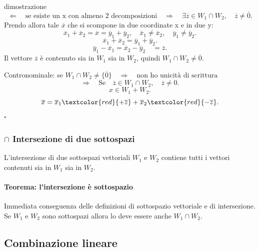 \documentclass[x11names]{article}
\newcommand*{\QEDB}{\null\nobreak\hfill\ensuremath{\square}}%
\begin{document}
\begin{es}{dimostrazione}
\[
\Leftarrow \quad \text{se esiste un x con almeno 2 decomposizioni} \quad \Rightarrow \quad \exists \overline{z} \in W_1 \cap W_2,\quad \overline{z} \neq \overline{0}
.\] 
Prendo allora tale $\overline{x}$ che si scompone in due coordinate x e in due y:
\[
\overline{x}_{1} + \overline{x}_{2} = \overline{x} = \overline{y}_{1} + \overline{y}_{2}, \quad \overline{x}_{1} \neq \overline{x}_{2}, \quad \overline{y}_{1} \neq \overline{y}_{2}
.\] 
\[
\overline{x}_{1} + \overline{x}_{2} = \overline{y}_{1} + \overline{y}_{2}
.\] 
\[
\overline{y}_{1} - \overline{x}_{1} = \overline{x}_{2} - \overline{y}_{2} \quad = \overline{z}
.\] 
Il vettore $\overline{z}$ è contenuto sia in $W_1$ sia in $W_2$, quindi $W_1 \cap W_2 \neq \overline{0}$.

Contronominale: se $W_1 \cap W_2 \neq \{\overline{0}\} \quad \Rightarrow \quad \text{non ho unicità di scrittura}$
\[
\Rightarrow \quad \text{Se} \quad \overline{z} \in W_1 \cap W_2, \quad\overline{z} \neq 0
.\] 
\[
x \in W_1 + W_2
.\] 
\[
\overline{x} = \overline{x}_{1} \textcolor{red}{+\overline{z}} + \overline{x}_{2} \textcolor{red}{-\overline{z}}
.\]  \QEDB
\end{es}


\subsubsection{$\cap$ Intersezione di due sottospazi}
L'intersezione di due sottospazi vettoriali $W_1$ e $W_2$ contiene tutti i vettori contenuti sia in $W_1$ sia in $W_2$.

\begin{center}
	\colorbox{myred}{\begin{minipage}{5.75in}
			\begin{redes}{}
				\paragraph{Teorema: l'intersezione è sottospazio}
				Immediata conseguenza delle definizioni di sottospazio vettoriale e di intersezione. Se $W_1$ e $W_2$ sono sottospazi allora lo deve essere anche $W_1 \cap W_2$.
					
			\end{redes}
	\end{minipage}}        
\end{center}



\subsection{Combinazione lineare}
\end{document}

